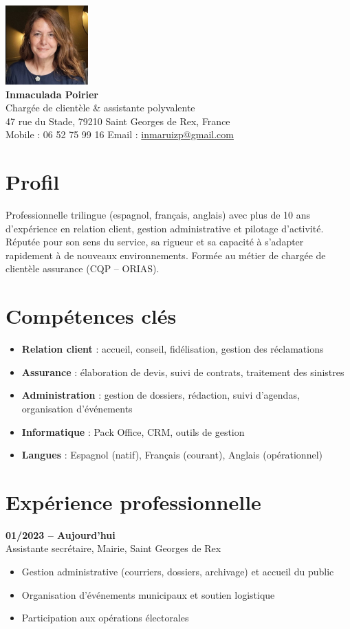 \documentclass[11pt,a4paper]{simplecv}
\begin{document}
\begin{center}
    \includegraphics[width=90pt]{photo.png}\\
    {\LARGE \textbf{Inmaculada Poirier}}\\
    Chargée de clientèle \& assistante polyvalente\\
    47 rue du Stade, 79210 Saint Georges de Rex, France\\
    Mobile : 06 52 75 99 16 \quad Email : \href{mailto:inmaruizp@gmail.com}{inmaruizp@gmail.com}
\end{center}

\section*{Profil}
Professionnelle trilingue (espagnol, français, anglais) avec plus de 10 ans d’expérience en relation client, gestion administrative et pilotage d’activité. Réputée pour son sens du service, sa rigueur et sa capacité à s’adapter rapidement à de nouveaux environnements. Formée au métier de chargée de clientèle assurance (CQP – ORIAS).

\section*{Compétences clés}
\begin{itemize}[label=\textbullet, leftmargin=*]
  \item \textbf{Relation client} : accueil, conseil, fidélisation, gestion des réclamations
  \item \textbf{Assurance} : élaboration de devis, suivi de contrats, traitement des sinistres
  \item \textbf{Administration} : gestion de dossiers, rédaction, suivi d’agendas, organisation d’événements
  \item \textbf{Informatique} : Pack Office, CRM, outils de gestion
  \item \textbf{Langues} : Espagnol (natif), Français (courant), Anglais (opérationnel)
\end{itemize}

\section*{Expérience professionnelle}
\textbf{01/2023 -- Aujourd’hui} \\
Assistante secrétaire, Mairie, Saint Georges de Rex
\begin{itemize}[leftmargin=*]
  \item Gestion administrative (courriers, dossiers, archivage) et accueil du public
  \item Organisation d’événements municipaux et soutien logistique
  \item Participation aux opérations électorales
\end{itemize}
\end{document}

